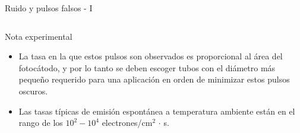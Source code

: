 \documentclass[a4paper,10pt]{beamer}
\begin{document}
\begin{frame}{Ruido y pulsos falsos - I}
\begin{columns}[c]
  \column{2.6in}
  \begin{exampleblock}{Nota experimental}
  \begin{itemize}[<+->]
   \item \begin{justify}
           La tasa en la que estos pulsos son observados es proporcional al área del fotocátodo,
	   y por lo tanto se deben escoger tubos con el diámetro más pequeño requerido para 
	  una aplicación en orden de minimizar estos pulsos oscuros.
         \end{justify}
  \item \begin{justify}
         Las tasas típicas de emisión espontánea a temperatura ambiente están en el 
         rango de los $10^2-10^4$ electrones/cm$^2$ $\cdot$ s. 
        \end{justify}
  \end{itemize}
  \end{exampleblock}
 
 \end{columns}
\end{frame}
\end{document}
